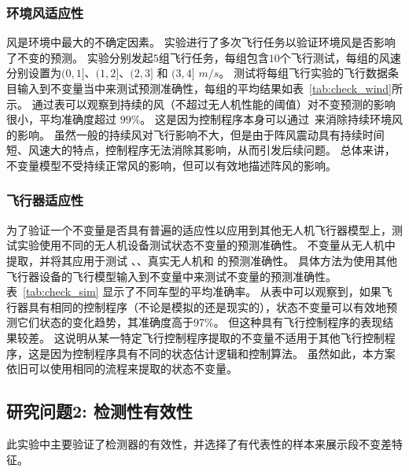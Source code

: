 


\subsubsection{环境风适应性}
风是环境中最大的不确定因素。
实验进行了多次飞行任务以验证环境风是否影响了不变的预测。
实验分别发起$5$组飞行任务，每组包含$10$个飞行测试，每组的风速分别设置为$(0,1]$、$(1,2]$、$(2,3]$ 和 $(3,4]$ $m/s$。
测试将每组飞行实验的飞行数据条目输入到不变量当中来测试预测准确性，每组的平均结果如表~\ref{tab:check_wind}所示。
通过表可以观察到持续的风（不超过无人机性能的阈值）对不变预测的影响很小，平均准确度超过 $99\%$。
这是因为控制程序本身可以通过~\cite{vilez2015trajectory}来消除持续环境风的影响。
虽然一般的持续风对飞行影响不大，但是由于阵风震动具有持续时间短、风速大的特点，控制程序无法消除其影响，从而引发后续问题。
总体来讲，不变量模型不受持续正常风的影响，但可以有效地描述阵风的影响。



\subsubsection{飞行器适应性}
为了验证一个不变量是否具有普遍的适应性以应用到其他无人机飞行器模型上，测试实验使用不同的无人机设备测试状态不变量的预测准确性。
不变量从无人机中提取，并将其应用于测试 、、真实无人机和  的预测准确性。
具体方法为使用其他飞行器设备的飞行模型输入到不变量中来测试不变量的预测准确性。
表~\ref{tab:check_sim} 显示了不同车型的平均准确率。
从表中可以观察到，如果飞行器具有相同的控制程序（不论是模拟的还是现实的），状态不变量可以有效地预测它们状态的变化趋势，其准确度高于97\%。
但这种具有飞行控制程序的表现结果较差。
这说明从某一特定飞行控制程序提取的不变量不适用于其他飞行控制程序，这是因为控制程序具有不同的状态估计逻辑和控制算法。
虽然如此，本方案依旧可以使用相同的流程来提取的状态不变量。




\subsection{研究问题2: 检测性有效性}
此实验中主要验证了检测器的有效性，并选择了有代表性的样本来展示段不变差特征。

